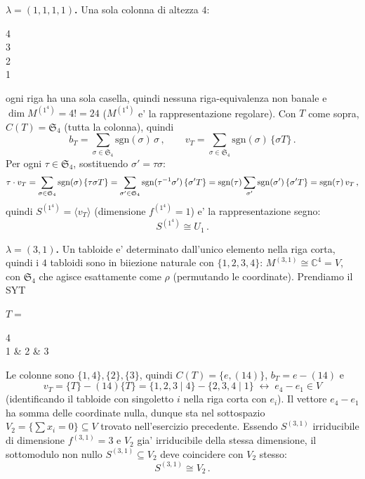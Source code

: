 {  \textbf{$ \lambda = (1,1,1,1) $.} Una sola colonna di altezza $4$:
  \begin{center}
    \begin{ytableau} 4 \\ 3 \\ 2 \\ 1 \end{ytableau}
  \end{center}
  ogni riga ha una sola casella, quindi nessuna riga-equivalenza non banale e $ \dim M^{(1^4)} = 4! = 24 $ ($ M^{(1^4)} $ e' la rappresentazione regolare). Con $ T $ come sopra, $ C(T) = \mathfrak{S}_4 $ (tutta la colonna), quindi
  \[
    b_T = \sum_{\sigma \in \mathfrak{S}_4} \mathrm{sgn}(\sigma)\, \sigma\,, \qquad v_T = \sum_{\sigma \in \mathfrak{S}_4} \mathrm{sgn}(\sigma)\, \{\sigma T\}\,.
  \]
  Per ogni $ \tau \in \mathfrak{S}_4 $, sostituendo $ \sigma' = \tau\sigma $:
  \[
    \tau \cdot v_T = \sum_{\sigma \in \mathfrak{S}_4} \mathrm{sgn}(\sigma)\, \{\tau\sigma T\} = \sum_{\sigma' \in \mathfrak{S}_4} \mathrm{sgn}(\tau^{-1} \sigma')\, \{\sigma' T\} = \mathrm{sgn}(\tau) \sum_{\sigma'} \mathrm{sgn}(\sigma')\, \{\sigma' T\} = \mathrm{sgn}(\tau)\, v_T\,,
  \]
  quindi $ S^{(1^4)} = \langle v_T \rangle $ (dimensione $ f^{(1^4)}=1 $) e' la rappresentazione segno:
  \[
    S^{(1^4)} \cong U_1\,.
  \]

  \textbf{$ \lambda = (3,1) $.} Un tabloide e' determinato dall'unico elemento nella riga corta, quindi i $4$ tabloidi sono in biiezione naturale con $ \{1,2,3,4\} $: $ M^{(3,1)} \cong \mathbb{C}^4 = V $, con $ \mathfrak{S}_4 $ che agisce esattamente come $ \rho $ (permutando le coordinate). Prendiamo il SYT
  \begin{center}
    $ T = $ \begin{ytableau} 4 \\ 1 & 2 & 3 \end{ytableau}
  \end{center}
  Le colonne sono $ \{1,4\}, \{2\}, \{3\} $, quindi $ C(T) = \{e,(14)\} $, $ b_T = e - (14) $ e
  \[
    v_T = \{T\} - (14)\{T\} = \{1,2,3\mid4\} - \{2,3,4\mid1\} \;\longleftrightarrow\; e_4 - e_1 \in V
  \]
  (identificando il tabloide con singoletto $ i $ nella riga corta con $ e_i $). Il vettore $ e_4-e_1 $ ha somma delle coordinate nulla, dunque sta nel sottospazio $ V_2 = \{\sum x_i = 0\} \subseteq V $ trovato nell'esercizio precedente. Essendo $ S^{(3,1)} $ irriducibile di dimensione $ f^{(3,1)}=3 $ e $ V_2 $ gia' irriducibile della stessa dimensione, il sottomodulo non nullo $ S^{(3,1)} \subseteq V_2 $ deve coincidere con $ V_2 $ stesso:
  \[
    S^{(3,1)} \cong V_2\,.
  \]

}
